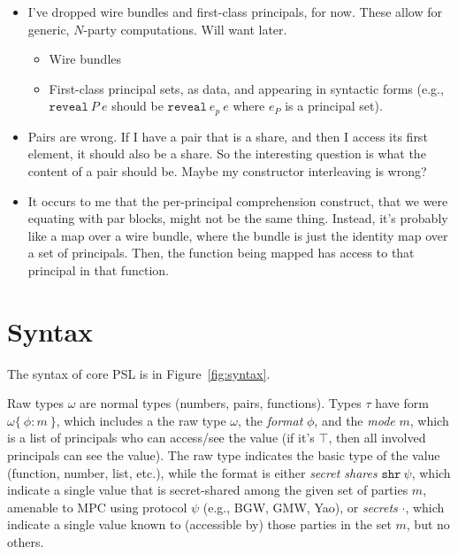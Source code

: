 \documentclass[10pt]{article}
\newcommand{\kw}[1]{\ensuremath{\mathtt{#1}}}
\newcommand{\ssec}{\ensuremath{\mathtt{\cdot}}}
\newcommand{\isec}{\ensuremath{\mathtt{pmap}}}
\newcommand{\sshare}[1]{\ensuremath{\mathtt{shr}~{#1}}}
\newcommand{\sectyp}[3]{\ensuremath{{#1} \{~{#2}:{#3}~\}}}
\newcommand{\ereveal}[2]{\ensuremath{\kw{reveal}~{#1}~{#2}}}
\begin{document}
\begin{itemize}
\item I've dropped wire bundles and first-class principals, for
  now. These allow for generic, $N$-party computations. Will want
  later.
  \begin{itemize}
  \item Wire bundles
  \item First-class principal sets, as data, and appearing in
    syntactic forms (e.g., $\ereveal{P}{e}$ should be
    $\ereveal{e_p}{e}$ where $e_P$ is a principal set).
  \end{itemize}
\item Pairs are wrong. If I have a pair that is a share, and then I
  access its first element, it should also be a share. So the
  interesting question is what the content of a pair should be. Maybe
  my constructor interleaving is wrong?
\item It occurs to me that the per-principal comprehension
  construct, that we were equating with par blocks, might not be the
  same thing. Instead, it's probably like a map over a wire bundle,
  where the bundle is just the identity map over a set of
  principals. Then, the function being mapped has access to that
  principal in that function.
\end{itemize}

\section{Syntax}
  
The syntax of core PSL is in Figure~\ref{fig:syntax}.

Raw types $\omega$ are normal types (numbers, pairs, functions). Types
$\tau$ have form $\sectyp{\omega}{\phi}{m}$, which includes a the raw
type $\omega$, the \emph{format} $\phi$, and the \emph{mode}
$m$, which is a list of principals who can access/see the value (if
it's $\top$, then all involved principals can see the value). The raw
type indicates the basic type of the value (function, number, list,
etc.), while the format is either \emph{secret shares} $\sshare\psi$,
which indicate a single value that is secret-shared among the given
set of parties $m$, amenable to MPC using protocol $\psi$ (e.g., BGW,
GMW, Yao), or \emph{secrets} \ssec, which indicate a single value
known to (accessible by) those parties in the set $m$, but no others.
\end{document}
